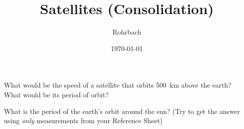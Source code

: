 \documentclass[10pt]{exam}
\title{Satellites (Consolidation)}
\author{Rohrbach}
\date{\today}
\begin{document}
\maketitle

\begin{questions}
  
  \question
    What would be the speed of a satellite that orbits 500~km above the earth?  What would be its period of orbit?
    \vs

  \question
    What is the period of the earth's orbit around the sun? (Try to get the answer using \emph{only} measurements from your Reference Sheet)
    \vs


\end{questions}
\end{document}
